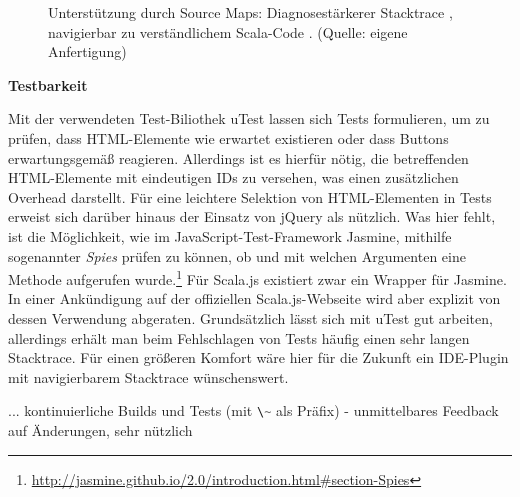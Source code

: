 \documentclass[a4paper, 12pt, hidelinks, listof=totoc, listoftables=totoc, bibliography=totoc]{scrreprt}
\newcommand{\code}[1]{\lstinline[language=Scala, style=inline]|#1|}
\newcommand{\MyMiniSec}[1]{\rmfamily\fontsize{12}{15}\selectfont
	\vspace{7pt}\textbf{#1} %
}
\begin{document}
\begin{figure}[!h]
	\centering
	\caption{Unterstützung durch Source Maps: Diagnosestärkerer Stacktrace \protect{}, navigierbar zu verständlichem Scala-Code \protect{}. (Quelle: eigene Anfertigung)}
	\label{fig:sourcemaps}
\end{figure}


\MyMiniSec{Testbarkeit}

Mit der verwendeten Test-Biliothek uTest lassen sich Tests formulieren, um zu prüfen, dass \ac{HTML}-Elemente wie erwartet existieren oder dass Buttons erwartungsgemäß reagieren. Allerdings ist es hierfür nötig, die betreffenden \ac{HTML}-Elemente mit eindeutigen IDs zu versehen, was einen zusätzlichen Overhead darstellt. Für eine leichtere Selektion von \ac{HTML}-Elementen in Tests erweist sich darüber hinaus der Einsatz von jQuery als nützlich. Was hier fehlt, ist die Möglichkeit, wie im JavaScript-Test-Framework Jasmine, mithilfe sogenannter \emph{Spies} prüfen zu können, ob und mit welchen Argumenten eine Methode aufgerufen wurde.\footnote{\url{http://jasmine.github.io/2.0/introduction.html\#section-Spies}} Für Scala.js existiert zwar ein Wrapper für Jasmine. In einer Ankündigung auf der offiziellen Scala.js-Webseite\cite{scalajs.ASJ} wird aber explizit von dessen Verwendung abgeraten. Grundsätzlich lässt sich mit uTest gut arbeiten, allerdings erhält man beim Fehlschlagen von Tests häufig einen sehr langen Stacktrace. Für einen größeren Komfort wäre hier für die Zukunft ein IDE-Plugin mit navigierbarem Stacktrace wünschenswert.

... kontinuierliche Builds und Tests (mit \code{\~} als Präfix) - unmittelbares Feedback auf Änderungen, sehr nützlich
\end{document}
